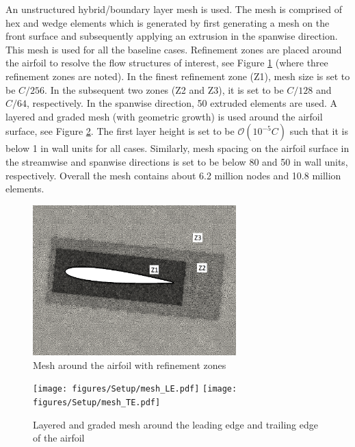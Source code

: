 An unstructured hybrid/boundary layer mesh is used.
The mesh is comprised of hex and wedge elements which is generated by first generating a mesh on the front surface and subsequently applying an extrusion in the spanwise direction. This mesh is used for all the baseline cases.
Refinement zones are placed around the airfoil to resolve the flow structures of interest, see Figure \ref{fig:mesh} (where three refinement zones are noted).
In the finest refinement zone (Z1), mesh size is set to be $C/256$.
In the subsequent two zones (Z2 and Z3), it is set to be $C/128$ and $C/64$, respectively.
In the spanwise direction, 50 extruded elements are used.
A layered and graded mesh (with geometric growth) is used around the airfoil surface, see Figure \ref{fig:mesh2}.
The first layer height is set to be $\mathcal{O}(10^{-5} C)$ such that it is below 1 in wall units for all cases.
Similarly, mesh spacing on the airfoil surface in the streamwise and spanwise directions is set to be below 80 and 50 in wall units, respectively.
Overall the mesh contains about 6.2 million nodes and 10.8 million elements.

\begin{figure}[H]
\centering
\includegraphics[width=0.7\textwidth]{figures/Setup/mesh_screenshot.pdf}
\caption{Mesh around the airfoil with refinement zones}
\label{fig:mesh}
\end{figure}

\begin{figure}[H]
\centering
\texttt{[image: figures/Setup/mesh\_LE.pdf]}
\texttt{[image: figures/Setup/mesh\_TE.pdf]}
\caption{Layered and graded mesh around the leading edge and trailing edge of the airfoil}
\label{fig:mesh2}
\end{figure}

